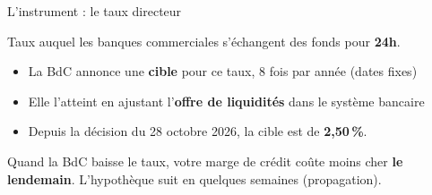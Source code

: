 \documentclass[aspectratio=169]{beamer}
\begin{document}
\begin{frame}[t]{L'instrument : le taux directeur}\examtag
   \small
   \vspace{0.15cm}
   \begin{defbox}
      Taux auquel les banques commerciales s'échangent des fonds pour \textbf{24h}.
   \end{defbox}
   \vspace{0.05cm}
   \begin{itemize}
      \setlength\itemsep{0.12cm}
      \item La BdC annonce une \textbf{cible} pour ce taux, 8 fois par année (dates fixes)
      \item Elle l'atteint en ajustant l'\textbf{offre de liquidités} dans le système bancaire
      \item Depuis la décision du 28 octobre 2026, la cible est de \textbf{2,50\,\%}.
   \end{itemize}
   \vspace{0.05cm}
   \begin{bizimplication}
      Quand la BdC baisse le taux, votre marge de crédit coûte moins cher \textbf{le lendemain}. L'hypothèque suit en quelques semaines (propagation).
   \end{bizimplication}
\end{frame}

\newcommand{\bankcircle}{%
   \begin{tikzpicture}[scale=0.9,
      bank/.style={rectangle, rounded corners=6pt, draw=HECnavy!40,
                   fill=HECnavy!10, minimum width=1.6cm, minimum height=0.7cm,
                   align=center, font=\small\bfseries, text=HECnavy, inner sep=4pt}]
      \draw[HECnavy!25, thick] (0,0) circle (2.0cm);
      \node[font=\footnotesize, text=HECgray, align=center] at (0,0) {Taux à\\un jour};
      \node[bank] (rbc)  at (90:2.6cm)  {RBC};
      \node[bank] (td)   at (30:2.6cm)  {TD};
      \node[bank] (bmo)  at (330:2.6cm) {BMO};
      \node[bank] (bn)   at (270:2.6cm) {BN};
      \node[bank] (cibc) at (210:2.6cm) {CIBC};
      \node[bank] (desj) at (150:2.6cm) {Desj.};
   \end{tikzpicture}%
}
\end{document}
